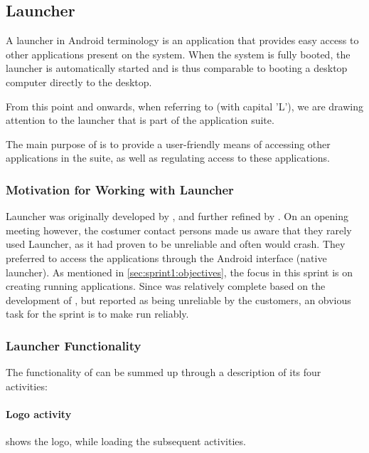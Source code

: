 \subsection{Launcher}\label{sec:launcher}
A launcher in Android terminology is an application that provides easy access to other applications present on the system.
When the system is fully booted, the launcher is automatically started and is thus comparable to booting a desktop computer directly to the desktop.

From this point and onwards, when referring to \textit{\launcher} (with capital 'L'), we are drawing attention to the launcher that is part of the \giraf application suite.

The main purpose of \launcher is to provide a user-friendly means of accessing other applications in the \giraf suite, as well as regulating access to these applications.

\subsubsection{Motivation for Working with Launcher}
Launcher was originally developed by \citet{launcher2011}, and further refined by \citet{launcher2012}.
On an opening meeting however, the costumer contact persons made us aware that they rarely used Launcher, as it had proven to be unreliable and often would crash. 
They preferred to access the \giraf applications through the Android interface (native launcher).
As mentioned in \cref{sec:sprint1:objectives}, the focus in this sprint is on creating running applications.
Since \launcher was relatively complete based on the development of \citet{launcher2012}, but reported as being unreliable by the customers, an obvious task for the sprint is to make \launcher run reliably.

\subsubsection{Launcher Functionality}
The functionality of \launcher can be summed up through a description of its four activities:

\paragraph{Logo activity} shows the \giraf logo, while loading the subsequent activities.

